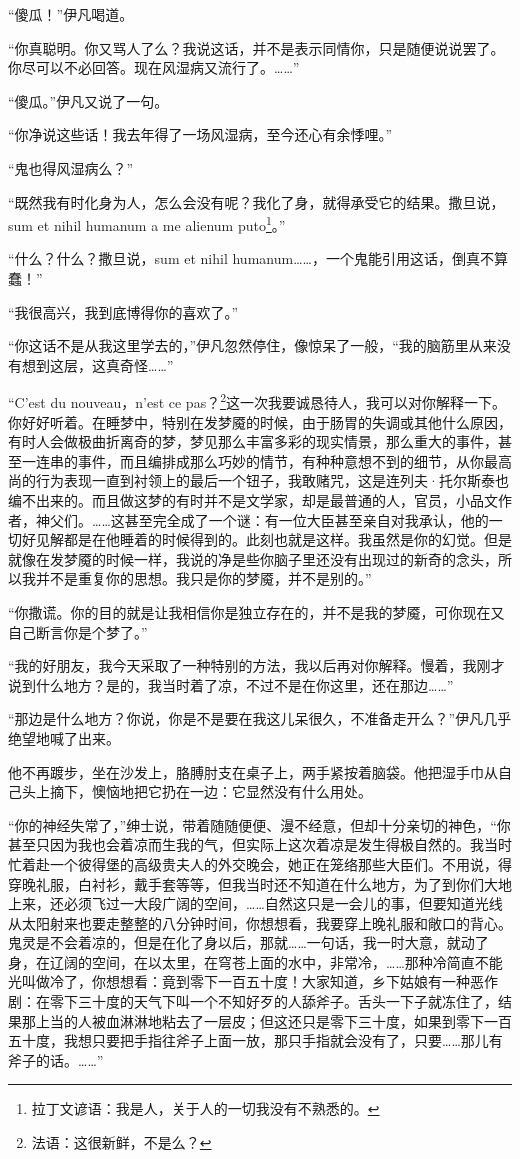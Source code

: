 \par “傻瓜！”伊凡喝道。
\par “你真聪明。你又骂人了么？我说这话，并不是表示同情你，只是随便说说罢了。你尽可以不必回答。现在风湿病又流行了。……”
\par “傻瓜。”伊凡又说了一句。
\par “你净说这些话！我去年得了一场风湿病，至今还心有余悸哩。”
\par “鬼也得风湿病么？”
\par “既然我有时化身为人，怎么会没有呢？我化了身，就得承受它的结果。撒旦说，sum et nihil humanum a me alienum puto\footnote{拉丁文谚语：我是人，关于人的一切我没有不熟悉的。}。”
\par “什么？什么？撒旦说，sum et nihil humanum……，一个鬼能引用这话，倒真不算蠢！”
\par “我很高兴，我到底博得你的喜欢了。”
\par “你这话不是从我这里学去的，”伊凡忽然停住，像惊呆了一般，“我的脑筋里从来没有想到这层，这真奇怪……”
\par “C’est du nouveau，n’est ce pas？\footnote{法语：这很新鲜，不是么？}这一次我要诚恳待人，我可以对你解释一下。你好好听着。在睡梦中，特别在发梦魇的时候，由于肠胃的失调或其他什么原因，有时人会做极曲折离奇的梦，梦见那么丰富多彩的现实情景，那么重大的事件，甚至一连串的事件，而且编排成那么巧妙的情节，有种种意想不到的细节，从你最高尚的行为表现一直到衬领上的最后一个钮子，我敢赌咒，这是连列夫·托尔斯泰也编不出来的。而且做这梦的有时并不是文学家，却是最普通的人，官员，小品文作者，神父们。……这甚至完全成了一个谜：有一位大臣甚至亲自对我承认，他的一切好见解都是在他睡着的时候得到的。此刻也就是这样。我虽然是你的幻觉。但是就像在发梦魇的时候一样，我说的净是些你脑子里还没有出现过的新奇的念头，所以我并不是重复你的思想。我只是你的梦魇，并不是别的。”
\par “你撒谎。你的目的就是让我相信你是独立存在的，并不是我的梦魇，可你现在又自己断言你是个梦了。”
\par “我的好朋友，我今天采取了一种特别的方法，我以后再对你解释。慢着，我刚才说到什么地方？是的，我当时着了凉，不过不是在你这里，还在那边……”
\par “那边是什么地方？你说，你是不是要在我这儿呆很久，不准备走开么？”伊凡几乎绝望地喊了出来。
\par 他不再踱步，坐在沙发上，胳膊肘支在桌子上，两手紧按着脑袋。他把湿手巾从自己头上摘下，懊恼地把它扔在一边：它显然没有什么用处。
\par “你的神经失常了，”绅士说，带着随随便便、漫不经意，但却十分亲切的神色，“你甚至只因为我也会着凉而生我的气，但实际上这次着凉是发生得极自然的。我当时忙着赴一个彼得堡的高级贵夫人的外交晚会，她正在笼络那些大臣们。不用说，得穿晚礼服，白衬衫，戴手套等等，但我当时还不知道在什么地方，为了到你们大地上来，还必须飞过一大段广阔的空间，……自然这只是一会儿的事，但要知道光线从太阳射来也要走整整的八分钟时间，你想想看，我要穿上晚礼服和敞口的背心。鬼灵是不会着凉的，但是在化了身以后，那就……一句话，我一时大意，就动了身，在辽阔的空间，在以太里，在穹苍上面的水中，非常冷，……那种冷简直不能光叫做冷了，你想想看：竟到零下一百五十度！大家知道，乡下姑娘有一种恶作剧：在零下三十度的天气下叫一个不知好歹的人舔斧子。舌头一下子就冻住了，结果那上当的人被血淋淋地粘去了一层皮；但这还只是零下三十度，如果到零下一百五十度，我想只要把手指往斧子上面一放，那只手指就会没有了，只要……那儿有斧子的话。……”
